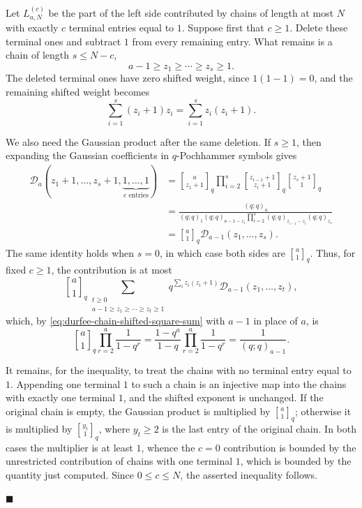 \documentclass[a4paper,11pt,reqno]{amsart}
\theoremstyle{plain}
\theoremstyle{remark}
\numberwithin{equation}{section}
\newcommand{\qgauss}[2]{\genfrac{[}{]}{0pt}{}{#1}{#2}_q}
\renewcommand{\leq}{\leqslant}
\renewcommand{\geq}{\geqslant}
\newenvironment{proofof}{{\bf Proof. }}{\hfill $\blacksquare$ \\}
\begin{document}
\begin{proofof}
Let $L_{a,N}^{(c)}$ be the part of the left side contributed by chains of
length at most $N$ with exactly $c$ terminal entries equal to $1$. Suppose
first that $c\geq 1$. Delete these terminal ones and subtract $1$ from every
remaining entry. What remains is a chain of length $s\leq N-c$,
\[
        a-1\geq z_1\geq\cdots\geq z_s\geq 1.
\]
The deleted terminal ones have zero shifted weight, since $1(1-1)=0$, and the
remaining shifted weight becomes
\[
        \sum_{i=1}^s (z_i+1)z_i=
        \sum_{i=1}^s z_i(z_i+1).
\]

We also need the Gaussian product after the same deletion. If $s\geq 1$, then
expanding the Gaussian coefficients in $q$-Pochhammer symbols gives
\[
\begin{aligned}
        \mathcal D_a(z_1+1,\ldots,z_s+1,\underbrace{1,\ldots,1}_{\text{$c$ entries}})
        &=
        \qgauss{a}{z_1+1}
        \prod_{i=2}^{s}\qgauss{z_{i-1}+1}{z_i+1}
        \qgauss{z_s+1}{1}                                      \\
        &=
        \frac{(q;q)_a}
        {(q;q)_1(q;q)_{a-1-z_1}
        \prod_{i=2}^{s}(q;q)_{z_{i-1}-z_i}(q;q)_{z_s}}           \\
        &=
        \qgauss{a}{1}\mathcal D_{a-1}(z_1,\ldots,z_s).
\end{aligned}
\]
The same identity holds when $s=0$, in which case both sides are
$\qgauss{a}{1}$. Thus, for fixed $c\geq 1$, the contribution is at most
\[
        \qgauss{a}{1}
        \sum_{\substack{t\geq 0\\ a-1\geq z_1\geq\cdots\geq z_t\geq 1}}
        q^{\sum_i z_i(z_i+1)}\mathcal D_{a-1}(z_1,\ldots,z_t),
\]
which, by \eqref{eq:durfee-chain-shifted-square-sum} with $a-1$ in place of $a$, is
\[
        \qgauss{a}{1}
        \prod_{r=2}^{a}\frac{1}{1-q^r}
        =
        \frac{1-q^a}{1-q}
        \prod_{r=2}^{a}\frac{1}{1-q^r}
        =
        \frac{1}{(q;q)_{a-1}}.
\]

It remains, for the inequality, to treat the chains with no terminal entry equal
to $1$. Appending one terminal $1$ to such a chain is an injective map into
the chains with exactly one terminal $1$, and the shifted exponent is
unchanged. If the original chain is empty, the Gaussian product is multiplied by
$\qgauss{a}{1}$; otherwise it is multiplied by $\qgauss{y_t}{1}$, where
$y_t\geq 2$ is the last entry of the original chain. In both cases the
multiplier is at least $1$, whence the $c=0$ contribution is bounded by the
unrestricted contribution of chains with one terminal $1$, which is bounded by
the quantity just computed. Since $0\leq c\leq N$, the asserted inequality
follows.


\end{proofof}
\end{document}
